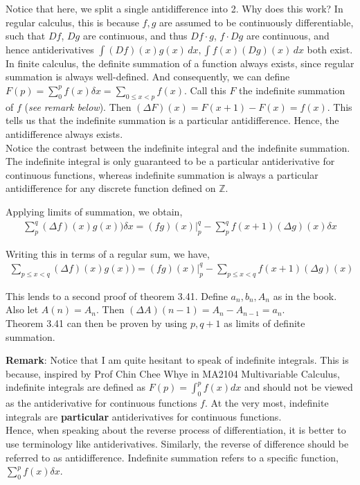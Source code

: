 \documentclass{article}
\begin{document}
Notice that here, we split a single antidifference into 2. Why does this work? In regular calculus, this is because $f, g$ are assumed to be continuously differentiable, such that $Df$, $Dg$ are continuous, and thus $Df\cdot g$, $f\cdot Dg$ are continuous, and hence antiderivatives $\int (Df)(x)g(x)\, dx, \int f(x)(Dg)(x)\, dx$ both exist.\\
In finite calculus, the definite summation of a function always exists, since regular summation is always well-defined. And consequently, we can define $F(p) = \sum_0^p f(x)\delta x = \sum_{0\leq x < p}f(x)$. Call this $F$ the indefinite summation of $f$ (\textit{see remark below}). Then $(\Delta F)(x) = F(x+1)-F(x) = f(x)$. This tells us that the indefinite summation is a particular antidifference.
Hence, the antidifference always exists.\\
Notice the contrast between the indefinite integral and the indefinite summation. The indefinite integral is only guaranteed to be a particular antiderivative for continuous functions, whereas indefinite summation is always a particular antidifference for any discrete function defined on $\mathbb{Z}$.


Applying limits of summation, we obtain,
\begin{align*}
	\sum_p^q (\Delta f)(x)g(x)) \delta x = (fg)(x)|_p^q - \sum_p^q f(x+1)(\Delta g)(x) \delta x
\end{align*}

Writing this in terms of a regular sum, we have,
\begin{align*}
	\sum_{p\leq x < q} (\Delta f)(x)g(x)) = (fg)(x)|_p^q - \sum_{p\leq x < q} f(x+1)(\Delta g)(x)
\end{align*}

This lends to a second proof of theorem 3.41.
Define $a_n,b_n,A_n$ as in the book. Also let $A(n) = A_n$. Then $(\Delta A)(n-1) = A_n - A_{n-1} = a_n$.\\
Theorem 3.41 can then be proven by using $p, q+1$ as limits of definite summation.

\textbf{Remark}: Notice that I am quite hesitant to speak of indefinite integrals. This is because, inspired by Prof Chin Chee Whye in MA2104 Multivariable Calculus, indefinite integrals are defined as $F(p)=\int_0^pf(x)dx$ and should not be viewed as the antiderivative for continuous functions $f$. At the very most, indefinite integrals are \textbf{particular} antiderivatives for continuous functions.\\
Hence, when speaking about the reverse process of differentiation, it is better to use terminology like antiderivatives. Similarly, the reverse of difference should be referred to as antidifference. Indefinite summation refers to a specific function, $\sum_0^p f(x)\delta x$.
\end{document}
